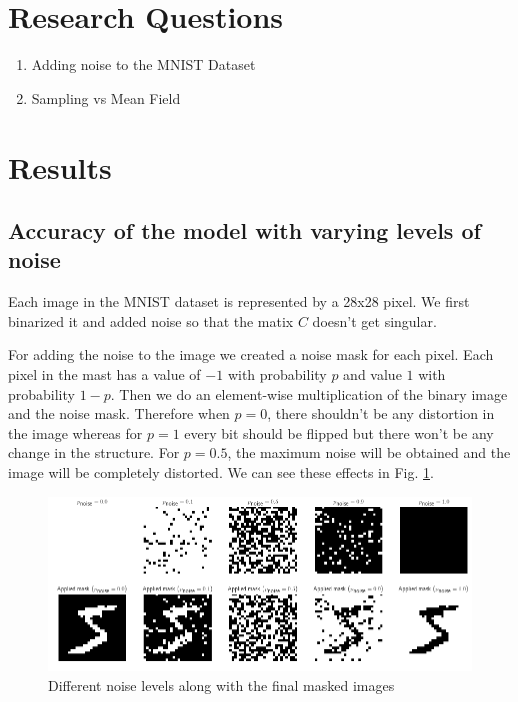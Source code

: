\documentclass{article}
\begin{document}
\section{Research Questions}
\begin{enumerate}
  \item Adding noise to the MNIST Dataset
  \item Sampling vs Mean Field
\end{enumerate}

\section{Results}

\subsection{Accuracy of the model with varying levels of noise}
Each image in the MNIST dataset is represented by a 28x28 pixel. We first 
binarized it and added noise so that the matix $ C $ doesn't get singular.

For adding the noise to the image we created a noise mask for each pixel. Each
pixel in the mast has a value of $ -1 $ with probability $ p $ and value $ 1 $
with probability $ 1-p $. Then we do an element-wise multiplication of the 
binary image and the noise mask. Therefore when $ p=0 $, there shouldn't be any
distortion in the image whereas for $ p=1 $ every bit should be flipped but 
there won't be any change in the structure. For $ p=0.5 $, the maximum noise
will be obtained and the image will be completely distorted. We can see these
effects in Fig. \ref{fig:noise_level}.

\begin{figure}[h]
  \centering
  \includegraphics[width=\textwidth]{noise}
  \caption{Different noise levels along with the final masked images}
  \label{fig:noise_level}
\end{figure}
\end{document}
